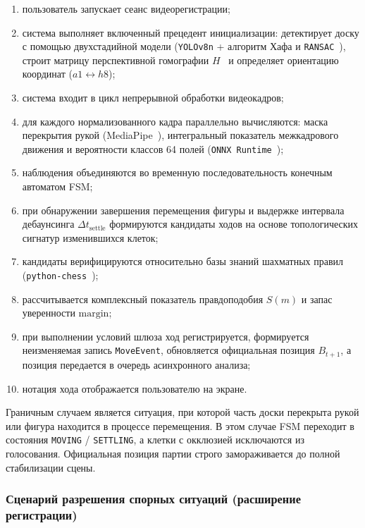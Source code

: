 \begin{enumerate}
    \item пользователь запускает сеанс видеорегистрации;
    \item система выполняет включенный прецедент инициализации: детектирует доску с помощью двухстадийной модели (\texttt{YOLOv8n} + алгоритм Хафа и \texttt{RANSAC}~\cite{Fischler1981,Bradski2000}), строит матрицу перспективной гомографии $H$~\cite{Szeliski2022} и определяет ориентацию координат ($a1 \leftrightarrow h8$);
    \item система входит в цикл непрерывной обработки видеокадров;
    \item для каждого нормализованного кадра параллельно вычисляются: маска перекрытия рукой (MediaPipe~\cite{Lugaresi2019}), интегральный показатель межкадрового движения и вероятности классов 64 полей (\texttt{ONNX Runtime}~\cite{ONNXRuntime2021});
    \item наблюдения объединяются во временную последовательность конечным автоматом FSM;
    \item при обнаружении завершения перемещения фигуры и выдержке интервала дебаунсинга $\Delta t_{\text{settle}}$ формируются кандидаты ходов на основе топологических сигнатур изменившихся клеток;
    \item кандидаты верифицируются относительно базы знаний шахматных правил (\texttt{python-chess}~\cite{Fiekas2024});
    \item рассчитывается комплексный показатель правдоподобия $S(m)$ и запас уверенности $\text{margin}$;
    \item при выполнении условий шлюза ход регистрируется, формируется неизменяемая запись \texttt{MoveEvent}, обновляется официальная позиция $B_{t+1}$, а позиция передается в очередь асинхронного анализа;
    \item нотация хода отображается пользователю на экране.
\end{enumerate}

Граничным случаем является ситуация, при которой часть доски перекрыта рукой или фигура находится в процессе перемещения. В этом случае FSM переходит в состояния \texttt{MOVING} / \texttt{SETTLING}, а клетки с окклюзией исключаются из голосования. Официальная позиция партии строго замораживается до полной стабилизации сцены.

\subsubsection{Сценарий разрешения спорных ситуаций (расширение регистрации)}

